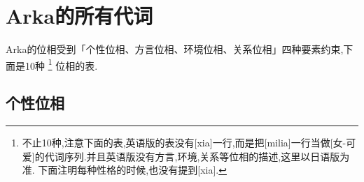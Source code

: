 \chapter[Arka的所有代词]{Arka的所有代词}
Arka的位相受到「个性位相、方言位相、环境位相、关系位相」四种要素约束,下面是10种
\footnote{
不止10种,注意下面的表,英语版的表没有[xia]一行,而是把[milia]一行当做[女-可爱]的代词序列.并且英语版没有方言,环境,关系等位相的描述,这里以日语版为准.
下面注明每种性格的时候,也没有提到[xia].
}
位相的表.
\section{个性位相}
